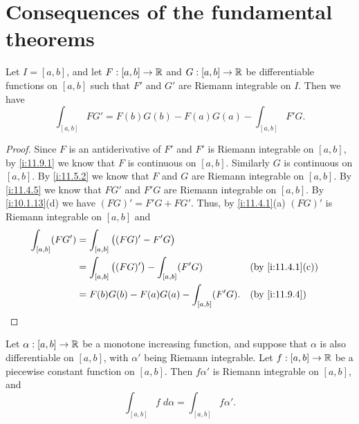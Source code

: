 \section{Consequences of the fundamental theorems}\label{i:sec:11.10}

\begin{prop}\label{i:11.10.1}
  Let \(I = [a, b]\), and let \(F : [a, b] \to \mathbb{R}\) and \(G : [a, b] \to \mathbb{R}\) be differentiable functions on \([a, b]\) such that \(F'\) and \(G'\) are Riemann integrable on \(I\).
  Then we have
  \[
    \int_{[a, b]} F G' = F(b) G(b) - F(a) G(a) - \int_{[a, b]} F' G.
  \]
\end{prop}

\begin{proof}
  Since \(F\) is an antiderivative of \(F'\) and \(F'\) is Riemann integrable on \([a, b]\), by \cref{i:11.9.1} we know that \(F\) is continuous on \([a, b]\).
  Similarly \(G\) is continuous on \([a, b]\).
  By \cref{i:11.5.2} we know that \(F\) and \(G\) are Riemann integrable on \([a, b]\).
  By \cref{i:11.4.5} we know that \(F G'\) and \(F' G\) are Riemann integrable on \([a, b]\).
  By \cref{i:10.1.13}(d) we have \((FG)' = F' G + F G'\).
  Thus, by \cref{i:11.4.1}(a) \((FG)'\) is Riemann integrable on \([a, b]\) and
  \begin{align*}
    \int_{[a, b]} (F G') & = \int_{[a, b]} \big((FG)' - F' G\big)                                       \\
                         & = \int_{[a, b]} \big((FG)'\big) - \int_{[a, b]} (F' G) &  & \by{i:11.4.1}[c] \\
                         & = F(b) G(b) - F(a) G(a) - \int_{[a, b]} (F' G).        &  & \by{i:11.9.4}
  \end{align*}
\end{proof}

\begin{thm}\label{i:11.10.2}
  Let \(\alpha : [a, b] \to \mathbb{R}\) be a monotone increasing function, and suppose that \(\alpha\) is also differentiable on \([a, b]\), with \(\alpha'\) being Riemann integrable.
  Let \(f : [a, b] \to \mathbb{R}\) be a piecewise constant function on \([a, b]\).
  Then \(f \alpha'\) is Riemann integrable on \([a, b]\), and
  \[
    \int_{[a, b]} f \; d \alpha = \int_{[a, b]} f \alpha'.
  \]
\end{thm}

